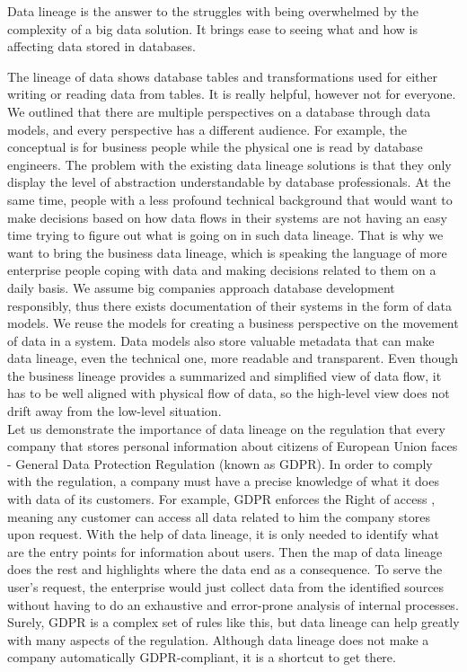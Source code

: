 Data lineage is the answer to the struggles with being overwhelmed by the complexity of a big data solution. It brings ease to seeing what and how is affecting data stored in databases.

The lineage of data shows database tables and transformations used for either writing or reading data from tables.  It is really helpful, however not for everyone. 
We outlined that there are multiple perspectives on a database through data models, and every perspective has a different audience. For example, the conceptual is for business people while the physical one is read by database engineers.
The problem with the existing data lineage solutions is that they only display the level of abstraction understandable by database professionals. 
At the same time, people with a less profound technical background that would want to make decisions based on how data flows in their systems are not having an easy time trying to figure out what is going on in such data lineage.
That is why we want to bring the business data lineage, which is speaking the language of more enterprise people coping with data and making decisions related to them on a daily basis. We assume big companies approach database development responsibly, thus there exists documentation of their systems in the form of data models. 
We reuse the models for creating a business perspective on the movement of data in a system. 
Data models also store valuable metadata that can make data lineage, even the technical one, more readable and transparent.
Even though the business lineage provides a summarized and simplified view of data flow, it has to be well aligned with physical flow of data, so the high-level view does not drift away from the low-level situation.\\

Let us demonstrate the importance of data lineage on the regulation that every company that stores personal information about citizens of European Union faces - General Data Protection Regulation (known as GDPR).
In order to comply with the regulation, a company must have a precise knowledge of what it does with data of its customers.  
For example, GDPR enforces the Right of access \cite{RightOfAccess}, meaning any customer can access all data related to him the company stores upon request. With the help of data lineage, it is only needed to identify what are the entry points for information about users. Then the map of data lineage does the rest and highlights where the data end as a consequence. To serve the user's request, the enterprise would just collect data from the identified sources without having to do an exhaustive and error-prone analysis of internal processes.
Surely, GDPR is a complex set of rules like this, but data lineage can help greatly with many aspects of the regulation. Although data lineage does not make a company automatically GDPR-compliant, it is a shortcut to get there. 

